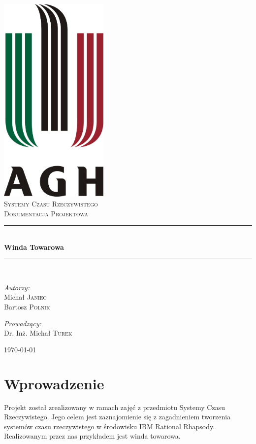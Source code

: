 \documentclass[a4paper,11pt]{article}
\newcommand{\HRule}{\rule{\linewidth}{0.5mm}}
\begin{document}
\begin{titlepage}
\begin{center}
\includegraphics[width=0.4\textwidth]{images/logo.jpg} \\[1cm]
\textsc{\LARGE Systemy Czasu Rzeczywistego} \\[0.8cm]
\textsc{\LARGE Dokumentacja Projektowa} \\[0.5cm]
\HRule \\[0.4cm]
{ \huge \bfseries Winda Towarowa} \\[0.4cm]
\HRule \\[1.5cm]
\begin{minipage}{0.4\textwidth}
\begin{flushleft} \large
\emph{Autorzy:} \\
Michał \textsc{Janiec} \\
Bartosz \textsc{Polnik}
\end{flushleft}
\end{minipage}
\begin{minipage}{0.4\textwidth}
\begin{flushright} \large
\emph{Prowadzący:} \\
Dr. Inż. Michał \textsc{Turek}
\end{flushright}
\end{minipage}

\vfill

{\large \today}

\end{center}
\end{titlepage}

\section{Wprowadzenie}
Projekt został zrealizowany w ramach zajęć z przedmiotu Systemy Czasu Rzeczywistego.
Jego celem jest zaznajomienie się z zagadnieniem tworzenia systemów czasu rzeczywistego w środowisku IBM Rational Rhapsody.
Realizowanym przez nas przykładem jest winda towarowa. 
\end{document}
